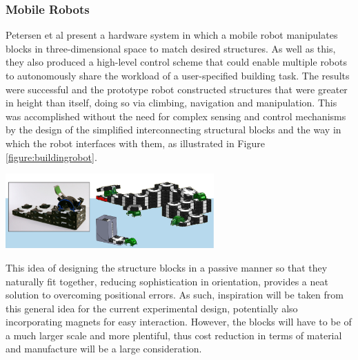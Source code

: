 \documentclass[11pt]{article}
\begin{document}
\subsubsection{Mobile Robots} \label{mobilerobots}
Petersen et al \cite{Petersen2011} present a hardware system in which a mobile robot manipulates blocks in three-dimensional space to match desired structures. As well as this, they also produced a high-level control scheme that could enable multiple robots to autonomously share the workload of a user-specified building task. The results were successful and the prototype robot constructed structures that were greater in height than itself, doing so via climbing, navigation and manipulation. This was accomplished without the need for complex sensing and control mechanisms by the design of the simplified interconnecting structural blocks and the way in which the robot interfaces with them, as illustrated in Figure \ref{figure:buildingrobot}.

\begin{center}
\includegraphics[width = 0.6\textwidth]{buildingrobot.png}
\label{figure:buildingrobot}
\end{center}

This idea of designing the structure blocks in a passive manner so that they naturally fit together, reducing sophistication in orientation, provides a neat solution to overcoming positional errors. As such, inspiration will be taken from this general idea for the current experimental design, potentially also incorporating magnets for easy interaction. However, the blocks will have to be of a much larger scale and more plentiful, thus cost reduction in terms of material and manufacture will be a large consideration.
\end{document}
